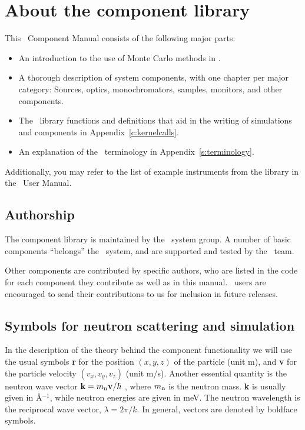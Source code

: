 
\chapter{About the component library}
\label{c:components}
This \MCX\ Component Manual consists of the following major parts:
\begin{itemize}
\item An introduction to the use of Monte Carlo methods in \MCX .
\item A thorough description of system components,
with one chapter per major category: Sources, optics,
monochromators, samples, monitors, and other components.
\item The \MCX\ library functions and definitions
  that aid in the writing of simulations and components in
  Appendix~\ref{c:kernelcalls}.
\item An explanation of the \MCX\ terminology in Appendix~\ref{s:terminology}.
\end{itemize}
Additionally, you may refer to the list of example instruments
from the library in the \MCX\ User Manual.

\section{Authorship}
The component library is
maintained by the \MCX\ system group. A number of basic components
``belongs'' the \MCX\ system, and are supported and tested by the \MCX\
team.

Other components are contributed
by specific authors, who are listed in the code for each component
they contribute as well as in this manual.
\MCX\ users are encouraged to send their
contributions to us for inclusion in future releases.


\section{Symbols for neutron scattering and simulation}
In the description of the theory behind the component functionality
we will use the usual symbols {\bf r} for the position
$(x,y,z)$ of the particle (unit m), and {\bf v} for
the particle velocity $(v_x, v_y, v_z)$ (unit m/s).
Another essential quantity is the neutron wave vector
${\bf k} = m_{\rm n} {\bf v}/\hbar$ , where
$m_{\rm n}$ is the neutron mass. {\bf k} is usually given in
\AA$^{-1}$, while neutron energies are given in meV.
The neutron wavelength is the reciprocal wave vector,
$\lambda=2 \pi / k$.
In general, vectors are denoted by boldface symbols.

